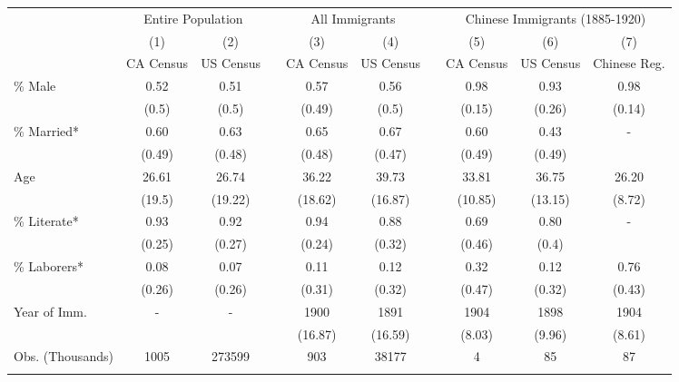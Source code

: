 \begin{tabular}{lccccccccc}
\hhline{==========}
& \multicolumn{2}{c}{Entire Population} & & \multicolumn{2}{c}{All Immigrants} & & \multicolumn{3}{c}{Chinese Immigrants (1885-1920)} \\ 
\hhline{~--~--~---}
& (1) & (2) & & (3) & (4) & & (5) & (6) & (7) \\ 
& CA Census & US Census & & CA Census & US Census & & CA Census & US Census & Chinese Reg. \\ 
 \hhline{----------}
\% Male & 0.52&0.51&&0.57&0.56&&0.98&0.93&0.98 \\ 
& (0.5)&(0.5)&&(0.49)&(0.5)&&(0.15)&(0.26)&(0.14) \\ 
\% Married* & 0.60&0.63&&0.65&0.67&&0.60&0.43&- \\ 
& (0.49)&(0.48)&&(0.48)&(0.47)&&(0.49)&(0.49)& \\ 
Age & 26.61&26.74&&36.22&39.73&&33.81&36.75&26.20 \\ 
& (19.5)&(19.22)&&(18.62)&(16.87)&&(10.85)&(13.15)&(8.72) \\ 
\% Literate* & 0.93&0.92&&0.94&0.88&&0.69&0.80&- \\ 
& (0.25)&(0.27)&&(0.24)&(0.32)&&(0.46)&(0.4)& \\ 
\% Laborers* & 0.08&0.07&&0.11&0.12&&0.32&0.12&0.76 \\ 
& (0.26)&(0.26)&&(0.31)&(0.32)&&(0.47)&(0.32)&(0.43) \\ 
Year of Imm. & -&-&&1900&1891&&1904&1898&1904 \\ 
& &&&(16.87)&(16.59)&&(8.03)&(9.96)&(8.61) \\ 
Obs. (Thousands)
&
1005&273599&&903&38177&&4&85&87
\\ 
\hhline{----------}
\end{tabular}
